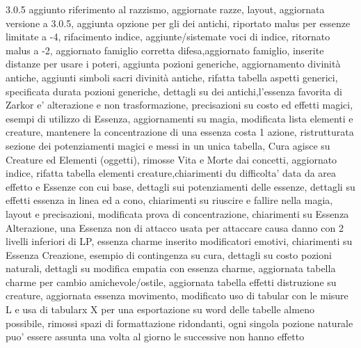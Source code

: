 \documentclass[a4paper,11pt,twoside,openany]{book}
\begin{document}
{    3.0.5 aggiunto riferimento al razzismo, aggiornate razze, layout, aggiornata versione a 3.0.5, aggiunta opzione per gli dei antichi, riportato malus per essenze limitate a -4, rifacimento indice, aggiunte/sistemate voci di indice, ritornato malus a -2, aggiornato famiglio corretta difesa,aggiornato famiglio, inserite distanze per usare i poteri, aggiunta pozioni generiche, aggiornamento divinità antiche, aggiunti simboli sacri divinità antiche, rifatta tabella aspetti generici, specificata durata pozioni generiche, dettagli su dei antichi,l'essenza favorita di Zarkor e' alterazione e non trasformazione, precisazioni su costo ed effetti magici, esempi di utilizzo di Essenza, aggiornamenti su magia, modificata lista elementi e creature, mantenere la concentrazione di una essenza costa 1 azione, ristrutturata sezione dei potenziamenti magici e messi in un unica tabella, Cura agisce su Creature ed Elementi (oggetti), rimosse Vita e Morte dai concetti, aggiornato indice, rifatta tabella elementi creature,chiarimenti du difficolta' data da area effetto e Essenze con cui base, dettagli sui potenziamenti delle essenze, dettagli su effetti essenza in linea  ed a cono, chiarimenti su riuscire e fallire nella magia, layout e precisazioni, modificata prova di concentrazione, chiarimenti su Essenza Alterazione, una Essenza non di attacco usata per attaccare causa danno con 2 livelli inferiori di LP, essenza charme inserito modificatori emotivi, chiarimenti su Essenza Creazione, esempio di contingenza su cura, dettagli su costo pozioni naturali, dettagli su modifica empatia con essenza charme, aggiornata tabella charme per cambio amichevole/ostile, aggiornata tabella effetti distruzione su creature, aggiornata essenza movimento, modificato uso di tabular con le misure L e usa di tabularx X per una esportazione su word delle tabelle almeno possibile, rimossi spazi di formattazione ridondanti, ogni singola pozione naturale puo' essere assunta una volta al giorno le successive non hanno effetto
}

\pagebreak
\printindex
\end{document}
